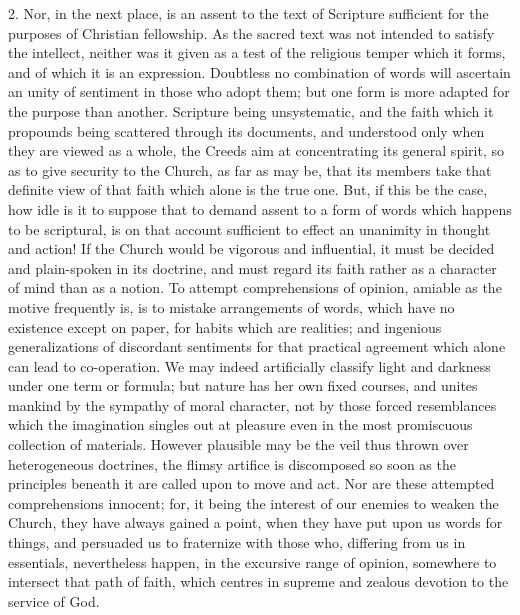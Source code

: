 2. Nor, in the next place, is an assent to the text of Scripture
sufficient for the purposes of Christian fellowship. As the sacred
text was not intended to satisfy the intellect, neither was it given
as a test of the religious temper which it forms, and of which it is
an expression. Doubtless no combination of words will ascertain
an unity of sentiment in those who adopt them; but one form is more
adapted for the purpose than another. Scripture being unsystematic,
and the faith which it propounds being scattered through its
documents, and understood only when they are viewed as a whole, the
Creeds aim at concentrating its general spirit, so as to give security
to the Church, as far as may be, that its members take that definite
view of that faith which alone is the true one. But, if this be the
case, how idle is it to suppose that to demand assent to a form of
words which happens to be scriptural, is on that account sufficient to
effect an unanimity in thought and action! If the Church would be
vigorous and influential, it must be decided and plain-spoken in its
doctrine, and must regard its faith rather as a character of mind than
as a notion. To attempt comprehensions of opinion, amiable as the
motive frequently is, is to mistake arrangements of words, which have
no existence except on paper, for habits which are realities; and
ingenious generalizations of discordant sentiments for that practical
agreement which alone can lead to co-operation. We may indeed
artificially classify light and darkness under one term or formula;
but nature has her own fixed courses, and unites mankind by the
sympathy of moral character, not by those forced resemblances which
the imagination singles out at pleasure even in the most promiscuous
collection of materials. However plausible may be the veil thus thrown
over heterogeneous doctrines, the flimsy artifice is discomposed so
soon as the principles beneath it are called upon to move and act. Nor
are these attempted comprehensions innocent; for, it being the
interest of our enemies to weaken the Church, they have always gained
a point, when they have put upon us words for things, and persuaded us
to fraternize with those who, differing from us in essentials,
nevertheless happen, in the excursive range of opinion, somewhere to
intersect that path of faith, which centres in supreme and zealous
devotion to the service of God.


